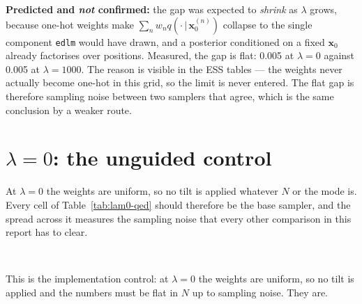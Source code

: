 \documentclass[11pt]{article}
\begin{document}
\textbf{Predicted and \emph{not} confirmed:} the gap was expected to
\emph{shrink} as $\lambda$ grows, because one-hot weights make
$\sum_n w_n q(\cdot\,|\,\mathbf{x}_0^{(n)})$ collapse to the single component
\texttt{edlm} would have drawn, and a posterior conditioned on a fixed
$\mathbf{x}_0$ already factorises over positions. Measured, the gap is flat:
0.005 at $\lambda=0$ against
0.005 at $\lambda=1000$. The reason is
visible in the ESS tables --- the weights never actually become one-hot in this
grid, so the limit is never entered. The flat gap is therefore sampling noise
between two samplers that agree, which is the same conclusion by a weaker route.

\section{$\lambda = 0$: the unguided control}

At $\lambda=0$ the weights are uniform, so no tilt is applied whatever $N$ or the
mode is. Every cell of Table~\ref{tab:lam0-qed} should therefore be
the base sampler, and the spread across it measures the sampling noise that every
other comparison in this report has to clear.

\begin{table}[htbp]
\centering
\small
{}
\\[0.4em] \begin{minipage}{0.92\textwidth}\footnotesize This is the implementation control: at $\lambda=0$ the weights are uniform, so no tilt is applied and the numbers must be flat in $N$ up to sampling noise. They are.\end{minipage}
\caption{novel-QED at $\lambda=0$. Every entry should be the base sampler, independent of $N$ and of the mode.}
\label{tab:lam0-qed}
\end{table}
\end{document}
